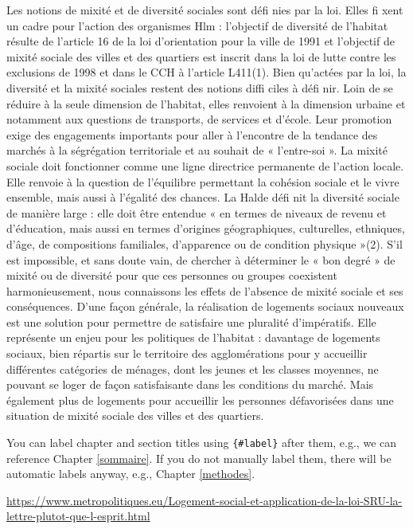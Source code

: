 \documentclass[
  french,
]{article}
\begin{document}
Les notions de mixité et de diversité sociales
sont défi nies par la loi. Elles fi xent un cadre
pour l'action des organismes Hlm : l'objectif de
diversité de l'habitat résulte de l'article 16 de la
loi d'orientation pour la ville de 1991 et l'objectif
de mixité sociale des villes et des quartiers est
inscrit dans la loi de lutte contre les exclusions
de 1998 et dans le CCH à l'article L411(1).
Bien qu'actées par la loi, la diversité et la mixité
sociales restent des notions diffi ciles à défi nir.
Loin de se réduire à la seule dimension de
l'habitat, elles renvoient à la dimension urbaine
et notamment aux questions de transports, de
services et d'école. Leur promotion exige des
engagements importants pour aller à l'encontre
de la tendance des marchés à la ségrégation
territoriale et au souhait de « l'entre-soi ».
La mixité sociale doit fonctionner comme
une ligne directrice permanente de l'action
locale. Elle renvoie à la question de l'équilibre
permettant la cohésion sociale et le vivre
ensemble, mais aussi à l'égalité des chances.
La Halde défi nit la diversité sociale de manière
large : elle doit être entendue « en termes de
niveaux de revenu et d'éducation, mais aussi en
termes d'origines géographiques, culturelles,
ethniques, d'âge, de compositions familiales,
d'apparence ou de condition physique »(2).
S'il est impossible, et sans doute vain, de
chercher à déterminer le « bon degré » de mixité
ou de diversité pour que ces personnes ou
groupes coexistent harmonieusement, nous
connaissons les effets de l'absence de mixité
sociale et ses conséquences.
D'une façon générale, la réalisation de logements
sociaux nouveaux est une solution pour
permettre de satisfaire une pluralité d'impératifs.
Elle représente un enjeu pour les politiques de
l'habitat : davantage de logements sociaux, bien
répartis sur le territoire des agglomérations pour
y accueillir différentes catégories de ménages,
dont les jeunes et les classes moyennes, ne
pouvant se loger de façon satisfaisante dans
les conditions du marché. Mais également plus
de logements pour accueillir les personnes
défavorisées dans une situation de mixité sociale
des villes et des quartiers.

You can label chapter and section titles using \texttt{\{\#label\}} after them, e.g., we can reference Chapter \ref{sommaire}. If you do not manually label them, there will be automatic labels anyway, e.g., Chapter \ref{methodes}.

\url{https://www.metropolitiques.eu/Logement-social-et-application-de-la-loi-SRU-la-lettre-plutot-que-l-esprit.html}
\end{document}
